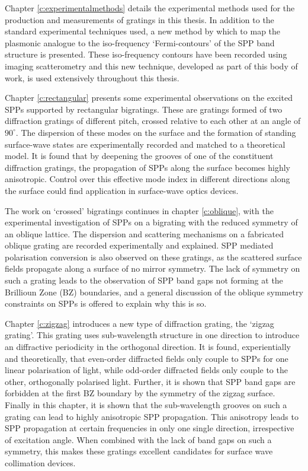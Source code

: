 Chapter \ref{c:experimentalmethods} details the experimental methods used for the production and measurements of gratings in this thesis. In addition to the standard experimental techniques used, a new method by which to map the plasmonic analogue to the iso-frequency `Fermi-contours' of the SPP band structure is presented. These iso-frequency contours have been recorded using imaging scatterometry and this new technique, developed as part of this body of work, is used extensively throughout this thesis.

Chapter \ref{c:rectangular} presents some experimental observations on the excited SPPs supported by rectangular bigratings. These are gratings formed of two diffraction gratings of different pitch, crossed relative to each other at an angle of $90^\circ$. The dispersion of these modes on the surface and the formation of standing surface-wave states are experimentally recorded and matched to a theoretical model. It is found that by deepening the grooves of one of the constituent diffraction gratings, the propagation of SPPs along the surface becomes highly anisotropic. Control over this effective mode index in different directions along the surface  could find application in surface-wave optics devices.

The work on `crossed' bigratings continues in chapter \ref{c:oblique}, with the experimental investigation of SPPs on a bigrating with the reduced symmetry of an oblique lattice. The dispersion and scattering mechanisms on a fabricated oblique grating are recorded experimentally and explained. SPP mediated polarisation conversion is also observed on these gratings, as the scattered surface fields propagate along a surface of no mirror symmetry. The lack of symmetry on such a grating leads to the observation of SPP band gaps not forming at the Brillioun Zone (BZ) boundaries, and a general discussion of the oblique symmetry constraints on SPPs is offered to explain why this is so.

Chapter \ref{c:zigzag} introduces a new type of diffraction grating, the `zigzag grating'. This grating uses sub-wavelength structure in one direction to introduce an diffractive periodicity in the orthogonal direction. It is found, experientially and theoretically, that even-order diffracted fields only couple to SPPs for one linear polarisation of light, while odd-order diffracted fields only couple to the other, orthogonally polarised light. Further, it is shown that SPP band gaps are forbidden at the first BZ boundary by the symmetry of the zigzag surface. Finally in this chapter, it is shown that the sub-wavelength grooves on such a grating can lead to highly anisotropic SPP propagation. This anisotropy leads to SPP propagation at certain frequencies in only one single direction, irrespective of excitation angle. When combined with the lack of band gaps on such a symmetry, this makes these gratings excellent candidates for surface wave collimation devices.

